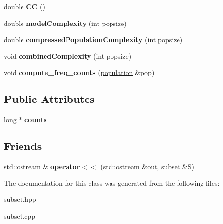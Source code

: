 \begin{DoxyCompactItemize}
\item 
\hypertarget{classsubset_a58e5d8fd4a5de0c2f2631f9a1a95ac66}{double {\bfseries \-C\-C} ()}\label{classsubset_a58e5d8fd4a5de0c2f2631f9a1a95ac66}

\item 
\hypertarget{classsubset_ae86d3738f7dcc98078941c1155edfce7}{double {\bfseries model\-Complexity} (int popsize)}\label{classsubset_ae86d3738f7dcc98078941c1155edfce7}

\item 
\hypertarget{classsubset_aafdbfe382d11e8c29a033c3fc35ce66d}{double {\bfseries compressed\-Population\-Complexity} (int popsize)}\label{classsubset_aafdbfe382d11e8c29a033c3fc35ce66d}

\item 
\hypertarget{classsubset_a70070d65cb3e7fe1e7a23f8c7b7e1ac1}{void {\bfseries combined\-Complexity} (int popsize)}\label{classsubset_a70070d65cb3e7fe1e7a23f8c7b7e1ac1}

\item 
\hypertarget{classsubset_a70195799d3c6b4f917030b8054947809}{void {\bfseries compute\-\_\-freq\-\_\-counts} (\hyperlink{classpopulation}{population} \&pop)}\label{classsubset_a70195799d3c6b4f917030b8054947809}

\end{DoxyCompactItemize}
\subsection*{\-Public \-Attributes}
\begin{DoxyCompactItemize}
\item 
\hypertarget{classsubset_adc4fe6c38f4abe6cde8fec84ebbf2142}{long $\ast$ {\bfseries counts}}\label{classsubset_adc4fe6c38f4abe6cde8fec84ebbf2142}

\end{DoxyCompactItemize}
\subsection*{\-Friends}
\begin{DoxyCompactItemize}
\item 
\hypertarget{classsubset_a3d120426c4a6b8d3f4d54754a7f6b775}{std\-::ostream \& {\bfseries operator$<$$<$} (std\-::ostream \&out, \hyperlink{classsubset}{subset} \&\-S)}\label{classsubset_a3d120426c4a6b8d3f4d54754a7f6b775}

\end{DoxyCompactItemize}


\-The documentation for this class was generated from the following files\-:\begin{DoxyCompactItemize}
\item 
subset.\-hpp\item 
subset.\-cpp\end{DoxyCompactItemize}
